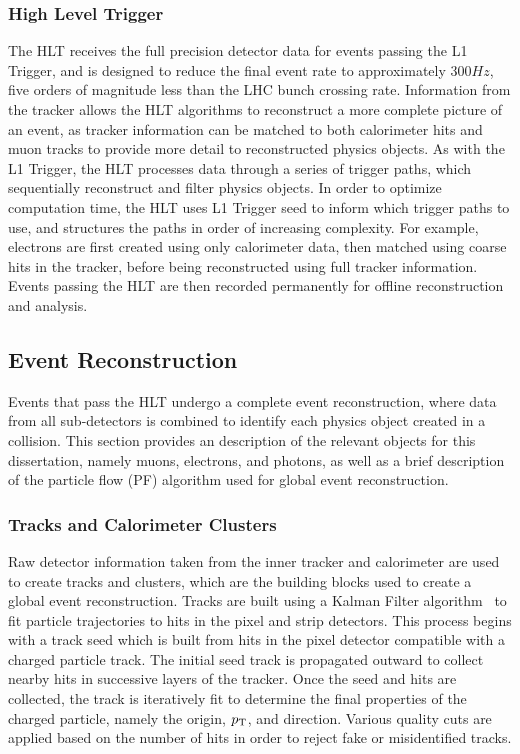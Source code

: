 \subsubsection{High Level Trigger} \label{sec:CMS_HLT}
The HLT receives the full precision detector data for events passing the L1 Trigger, and is designed to reduce the final event rate to approximately $300\unit{Hz}$, five orders of magnitude less than the LHC bunch crossing rate. Information from the tracker allows the HLT algorithms to reconstruct a more complete picture of an event, as tracker information can be matched to both calorimeter hits and muon tracks to provide more detail to reconstructed physics objects. As with the L1 Trigger, the HLT processes data through a series of trigger paths, which sequentially reconstruct and filter physics objects. In order to optimize computation time, the HLT uses L1 Trigger seed to inform which trigger paths to use, and structures the paths in order of increasing complexity. For example, electrons are first created using only calorimeter data, then matched using coarse hits in the tracker, before being reconstructed using full tracker information. Events passing the HLT are then recorded permanently for offline reconstruction and analysis. 

\subsection{Event Reconstruction} \label{sec:CMS_Reco}
Events that pass the HLT undergo a complete event reconstruction, where data from all sub-detectors is combined to identify each physics object created in a collision. This section provides an description of the relevant objects for this dissertation, namely muons, electrons, and photons, as well as a brief description of the particle flow (PF) algorithm used for global event reconstruction.

\subsubsection{Tracks and Calorimeter Clusters} \label{sec:CMS_trk_clusters}
Raw detector information taken from the inner tracker and calorimeter are used to create tracks and clusters, which are the building blocks used to create a global event reconstruction. Tracks are built using a Kalman Filter algorithm~\cite{cms_tracking} to fit particle trajectories to hits in the pixel and strip detectors. This process begins with a track seed which is built from hits in the pixel detector compatible with a charged particle track. The initial seed track is propagated outward to collect nearby hits in successive layers of the tracker. Once the seed and hits are collected, the track is iteratively fit to determine the final properties of the charged particle, namely the origin, $p_{\mathrm{T}}$, and direction. Various quality cuts are applied based on the number of hits in order to reject fake or misidentified tracks.

